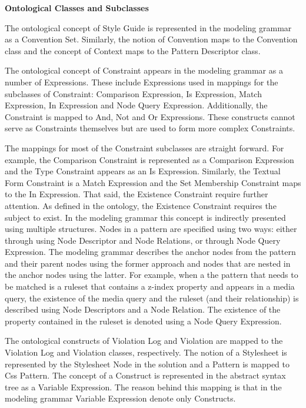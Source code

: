 \documentclass[parskip=full]{uvamscse}
\begin{document}
\textbf{Ontological Classes and Subclasses}

The ontological concept of Style Guide is represented in the modeling grammar as a Convention Set.
Similarly, the notion of Convention maps to the Convention class and the concept of Context maps to
the Pattern Descriptor class.

The ontological concept of Constraint appears in the modeling grammar as a number of Expressions.
These include Expressions used in mappings for the subclasses of Constraint: Comparison Expression,
Is Expression, Match Expression, In Expression and Node Query Expression. Additionally, the
Constraint is mapped to And, Not and Or Expressions. These constructs cannot serve as Constraints
themselves but are used to form more complex Constraints.

The mappings for most of the Constraint subclasses are straight forward. For example, the Comparison
Constraint is represented as a Comparison Expression and the Type Constraint appears as an Is
Expression. Similarly, the Textual Form Constraint is a Match Expression and the Set Membership
Constraint maps to the In Expression. That said, the Existence Constraint require further attention.
As defined in the ontology, the Existence Constraint requires the subject to exist. In the modeling
grammar this concept is indirectly presented using multiple structures. Nodes in a pattern are
specified using two ways: either through using Node Descriptor and Node Relations, or through Node
Query Expression. The modeling grammar describes the anchor nodes from the pattern and their parent
nodes using the former approach and nodes that are nested in the anchor nodes using the latter. For
example, when a the pattern that needs to be matched is a ruleset that contains a z-index property
and appears in a media query, the existence of the media query and the ruleset (and their
relationship) is described using Node Descriptors and a Node Relation. The existence of the property
contained in the ruleset is denoted using a Node Query Expression.

The ontological constructs of Violation Log and Violation are mapped to the Violation Log and
Violation classes, respectively. The notion of a Stylesheet is represented by the Stylesheet Node in
the solution and a Pattern is mapped to Css Pattern. The concept of a Construct is represented in
the abstract syntax tree as a Variable Expression. The reason behind this mapping is that in the
modeling grammar Variable Expression denote only Constructs.
\end{document}
